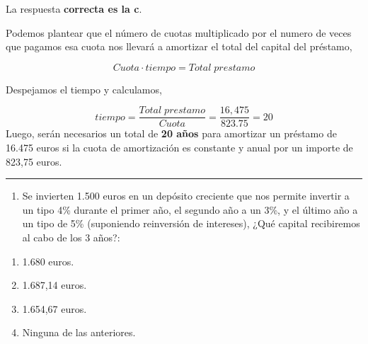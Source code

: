 \documentclass[
  letterpaper,
  DIV=11,
  numbers=noendperiod]{scrreprt}
\providecommand{\tightlist}{%
  \setlength{\itemsep}{0pt}\setlength{\parskip}{0pt}}\usepackage{longtable,booktabs,array}
\begin{document}
\begin{tcolorbox}[enhanced jigsaw, left=2mm, opacityback=0, colback=white, breakable, arc=.35mm, bottomrule=.15mm, rightrule=.15mm, toprule=.15mm, leftrule=.75mm, colframe=quarto-callout-tip-color-frame]
\begin{minipage}[t]{5.5mm}
\textcolor{quarto-callout-tip-color}{\faLightbulb}
\end{minipage}%
\begin{minipage}[t]{\textwidth - 5.5mm}

La respuesta \textbf{correcta es la c}.

Podemos plantear que el número de cuotas multiplicado por el numero de
veces que pagamos esa cuota nos llevará a amortizar el total del capital
del préstamo,

\[Cuota\cdot tiempo=Total\;prestamo\]

Despejamos el tiempo y calculamos,

\[tiempo=\frac {Total\;prestamo} {Cuota}=\frac {16,475} {823.75}=20\]
Luego, serán necesarios un total de \textbf{20 años} para amortizar un
préstamo de 16.475 euros si la cuota de amortización es constante y
anual por un importe de 823,75 euros.

\end{minipage}%
\end{tcolorbox}

\begin{center}\rule{0.5\linewidth}{0.5pt}\end{center}

\begin{enumerate}
\def\labelenumi{\arabic{enumi}.}
\setcounter{enumi}{13}
\tightlist
\item
  Se invierten 1.500 euros en un depósito creciente que nos permite
  invertir a un tipo 4\% durante el primer año, el segundo año a un 3\%,
  y el último año a un tipo de 5\% (suponiendo reinversión de
  intereses), ¿Qué capital recibiremos al cabo de los 3 años?:
\end{enumerate}

\begin{enumerate}
\def\labelenumi{\alph{enumi})}
\item
  1.680 euros.
\item
  1.687,14 euros.
\item
  1.654,67 euros.
\item
  Ninguna de las anteriores.
\end{enumerate}
\end{document}
